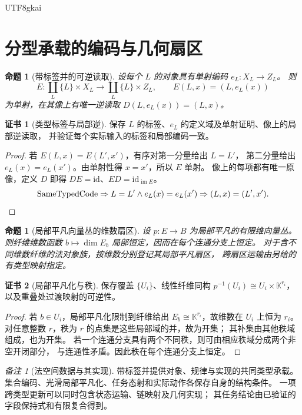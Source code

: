 \documentclass[12pt,a4paper,openany,notitlepage]{report}
\theoremstyle{plain}
\newtheorem{proposition}[theorem]{命题}
\theoremstyle{definition}
\newtheorem*{certificate}{证书}
\theoremstyle{remark}
\newtheorem{remark}[theorem]{备注}
\begin{document}
\begin{CJK*}{UTF8}{gkai}
\section{分型承载的编码与几何扇区}

\begin{proposition}[带标签并的可逆读取]
\label{exp:law:typed-union}
设每个 $L$ 的对象具有单射编码 $e_L:X_L\to Z_L$。
则
\[
 E:\coprod_L\{L\}\times X_L\longrightarrow
   \coprod_L\{L\}\times Z_L,
 \qquad E(L,x)=(L,e_L(x))
\]
为单射，在其像上有唯一逆读取
$D(L,e_L(x))=(L,x)$。
\end{proposition}
\begin{certificate}[类型标签与局部逆]
保存 $L$ 的标签、$e_L$ 的定义域及单射证明、像上的局部逆读取，
并验证每个实际输入的标签和局部编码一致。
\end{certificate}
\begin{proof}
若 $E(L,x)=E(L',x')$，有序对第一分量给出 $L=L'$，
第二分量给出 $e_L(x)=e_L(x')$。由单射性得 $x=x'$，所以 $E$ 单射。
像上的每项都有唯一原像，定义 $D$ 即得
$DE=\mathrm{id}$、$ED=\mathrm{id}_{\operatorname{im}E}$。
\[
 \operatorname{SameTypedCode}
 \Rightarrow L=L'\land e_L(x)=e_L(x')
 \Rightarrow(L,x)=(L',x').\qedhere
\]
\end{proof}

\begin{proposition}[局部平凡向量丛的维数扇区]
\label{exp:law:rank-sector}
设 $p:E\to B$ 为局部平凡的有限维向量丛。
则纤维维数函数 $b\mapsto\dim E_b$ 局部恒定，因而在每个连通分支上恒定。
对于含不同维数纤维的法对象族，按维数分别登记其局部平凡扇区，
跨扇区运输由另给的有类型映射指定。
\end{proposition}
\begin{certificate}[局部平凡化与秩]
保存覆盖 $\{U_i\}$、线性纤维同构
$p^{-1}(U_i)\cong U_i\times\mathbb K^{r_i}$，
以及重叠处过渡映射的可逆性。
\end{certificate}
\begin{proof}
若 $b\in U_i$，局部平凡化限制到纤维给出
$E_b\cong\mathbb K^{r_i}$，故维数在 $U_i$ 上恒为 $r_i$。
对任意整数 $r$，秩为 $r$ 的点集是这些局部域的并，故为开集；
其补集由其他秩域组成，也为开集。
若一个连通分支具有两个不同秩，则可由相应秩域分成两个非空开闭部分，
与连通性矛盾。因此秩在每个连通分支上恒定。
\end{proof}

\begin{remark}[法空间数据与其实现]
带标签并提供对象、规律与实现的共同类型承载。
集合编码、光滑局部平凡化、任务态射和实际动作各保存自身的结构条件。
一项跨类型更新可以同时包含状态运输、链映射及几何实现；
其任务结论由已验证的字段保持式和有限复合得到。
\end{remark}



\end{CJK*}
\end{document}
